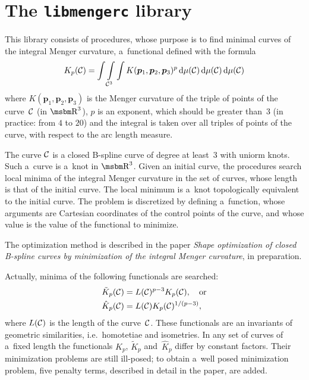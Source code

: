 

\chapter{The \texttt{libmengerc} library}

This library consists of procedures, whose purpose is to find minimal curves
of the integral Menger curvature, a~functional defined with the formula
\begin{align*}
  K_p({\cal C}) = \int\int\limits_{{\cal C}^3}\int
 K(\bm{p}_1,\bm{p}_2,\bm{p}_3)^p\,\mathrm{d}\mu({\cal C})\,\mathrm{d}\mu({\cal
 C})\,\mathrm{d}\mu({\cal C})
\end{align*}
where $K(\bm{p}_1,\bm{p}_2,\bm{p}_3)$ is the Menger curvature of the triple
of points of the curve~$\cal C$ (in $\R^3$), $p$ is an exponent, which should be
greater than~$3$ (in practice: from $4$ to $20$) and the integral is taken
over all triples of points of the curve, with respect to the arc length
measure.

The curve $\cal C$ is a closed B-spline curve of degree at least~$3$ with
uniorm knots. Such a~curve is a~knot in $\R^3$. Given an initial curve, the
procedures search local minima of the integral Menger curvature in the set
of curves, whose length is that of the initial curve. The local minimum is
a~knot topologically equivalent to the initial curve. The problem is
discretized by defining a~function, whose arguments are Cartesian
coordinates of the control points of the curve, and whose value is the
value of the functional to minimize.

The optimization method is described in the paper \emph{Shape optimization of
closed B-spline curves by minimization of the integral Menger curvature},
in preparation.

Actually, minima of the following functionals are searched:
\begin{align*}
  \tilde{K}_p({\cal C})&{}= L({\cal C})^{p-3}K_p({\cal C}),\quad\mbox{or} \\
  \hat{K}_p({\cal C})&{}= L({\cal C})K_p({\cal C})^{1/(p-3)},
\end{align*}
where $L({\cal C})$ is the length of the curve~$\cal C$. These functionals
are an invariants of geometric similarities, i.e.\ homotetiae and isometries.
In any set of curves of a~fixed length the functionals $K_p$,
$\tilde{K}_p$ and~$\hat{K}_p$ differ by constant factors.
Their minimization problems are still ill-posed; to obtain a~well
posed minimization problem, five penalty terms, described in detail in the
paper, are added.

